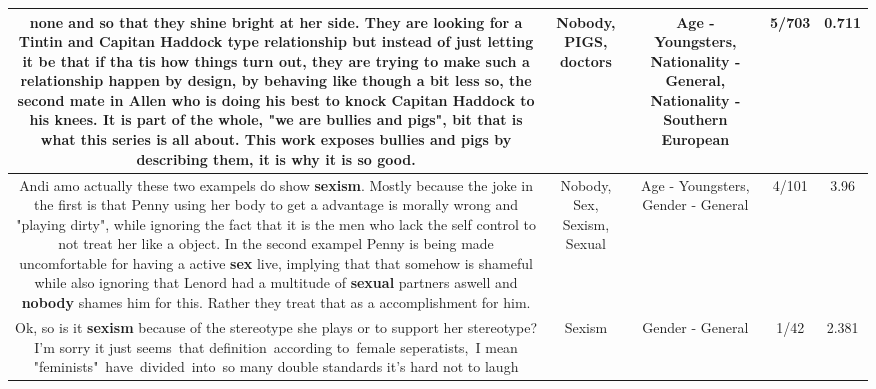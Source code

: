 \documentclass[11pt]{article}
\newlength\mylength
\begin{document}
\begin{center}
\begin{longtable}{|C{.65\mylength}|C{.30\mylength}|C{.12\mylength}|C{.12\mylength}|C{.12\mylength}|}
none and so that they shine bright at her side. They are looking for a  Tintin and Capitan Haddock type relationship but instead of just letting it be that if tha tis how things turn out, they are trying to make such a relationship happen by design, by behaving like though a bit less so, the second mate in Allen who is doing his best to knock Capitan Haddock to his knees. It is part of the whole, "we are bullies and \textbf{pigs}", bit that is what this series is all about.  This work exposes bullies and \textbf{pigs} by describing them, it is why it is so good.\normalsize   & Nobody, PIGS, doctors & Age - Youngsters, Nationality - General, Nationality - Southern European & 5/703 & 0.711 \\  \hline
  \small Andi amo actually these two exampels do show \textbf{sexism}. Mostly because the joke in the first is that Penny using her body to get a advantage is morally wrong and "playing dirty", while ignoring the fact that it is the men who lack the self control to not treat her like a object. In the second exampel Penny is being made uncomfortable for having a active \textbf{sex} live, implying that that somehow is shameful while also ignoring that Lenord had a multitude of \textbf{sexual} partners aswell and \textbf{nobody} shames him for this. Rather they treat that as a accomplishment for him.\normalsize   & Nobody, Sex, Sexism, Sexual & Age - Youngsters, Gender - General & 4/101 & 3.96 \\  \hline
  \small Ok, so is it \textbf{sexism} because of the stereotype she plays or to support her stereotype? I'm sorry it just seems that definition according to female seperatists, I mean "feminists" have divided into so many double standards it's hard not to laugh\normalsize   & Sexism & Gender - General & 1/42 & 2.381 \\  \hline

\end{longtable}
\end{center}
\end{document}
